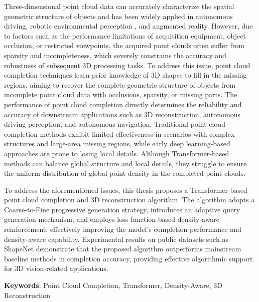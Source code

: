 Three-dimensional point cloud data can accurately characterize the spatial geometric structure of objects and has been widely applied in autonomous driving, robotic environmental perception , and augmented reality. However, due to factors such as the performance limitations of acquisition equipment, object occlusion, or restricted viewpoints, the acquired point clouds often suffer from sparsity and incompleteness, which severely constrains the accuracy and robustness of subsequent 3D processing tasks. To address this issue, point cloud completion techniques learn prior knowledge of 3D shapes to fill in the missing regions, aiming to recover the complete geometric structure of objects from incomplete point cloud data with occlusions, sparsity, or missing parts. The performance of point cloud completion directly determines the reliability and accuracy of downstream applications such as 3D reconstruction, autonomous driving perception, and autonomous navigation. Traditional point cloud completion methods exhibit limited effectiveness in scenarios with complex structures and large-area missing regions, while early deep learning-based approaches are prone to losing local details. Although Transformer-based methods can balance global structure and local details, they struggle to ensure the uniform distribution of global point density in the completed point clouds.

To address the aforementioned issues, this thesis proposes a Transformer-based point cloud completion and 3D reconstruction algorithm. The algorithm adopts a Coarse-to-Fine progressive generation strategy, introduces an adaptive query generation mechanism, and employs loss function-based density-aware reinforcement, effectively improving the model's completion performance and density-aware capability. Experimental results on public datasets such as ShapeNet demonstrate that the proposed algorithm outperforms mainstream baseline methods in completion accuracy, providing effective algorithmic support for 3D vision-related applications.

\vspace{8mm}

\textbf{Keywords}: Point Cloud Completion, Transformer, Density-Aware, 3D Reconstruction
